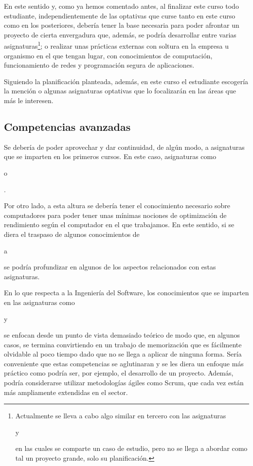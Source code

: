 En este sentido y, como ya hemos comentado antes,
al finalizar este curso todo estudiante,
independientemente de las optativas que curse
tanto en este curso como en los posteriores,
debería tener la base necesaria para
poder afrontar un proyecto de cierta envergadura que, además,
se podría desarrollar entre varias asignaturas\footnote{
    Actualmente se lleva a cabo algo similar en tercero con las asignaturas
    \subject{Procesos de Desarrollo Software} y
    \subject{Gestión de Procesos de Desarrollo Software}
    en las cuales se comparte un caso de estudio,
    pero no se llega a abordar como tal un proyecto grande,
    solo su planificación.
}; o realizar unas prácticas externas con soltura en la empresa u organismo
en el que tengan lugar,
con conocimientos de computación,
funcionamiento de redes y
programación segura de aplicaciones.

Siguiendo la planificación planteada, además,
en este curso el estudiante escogería la mención o
algunas asignaturas optativas
que lo focalizarán en las áreas que más le interesen.

\subsection{Competencias avanzadas}

Se debería de poder aprovechar y dar continuidad, de algún modo,
a asignaturas que se imparten en los primeros cursos.
En este caso, asignaturas como
\subject{Programación Concurrente y Distribuida} o \subject{Bases de Datos}.

Por otro lado, a esta altura se debería tener
el conocimiento necesario sobre computadores para
poder tener unas mínimas nociones de optimización de rendimiento
según el computador en el que trabajamos.
En este sentido, si se diera el traspaso de algunos conocimientos de
\subject{Arquitectura y Organización de Computadores} a
\subject{Ampliación de Estructura de Computadores}
se podría profundizar en algunos de los aspectos
relacionados con estas asignaturas.

En lo que respecta a la Ingeniería del Software,
los conocimientos que se imparten en las asignaturas como
\subject{Procesos de Desarrollo Software} y
\subject{Gestión de Proyectos de Desarrollo de Software}
se enfocan desde un punto de vista demasiado teórico de modo que,
en algunos casos,
se termina convirtiendo en un trabajo de memorización que
es fácilmente olvidable al poco tiempo
dado que no se llega a aplicar de ninguna forma.
Sería conveniente que estas competencias se aglutinaran y
se les diera un enfoque más práctico como podría ser, por ejemplo,
el desarrollo de un proyecto.
Además, podría considerarse utilizar metodologías ágiles como Scrum,
que cada vez están más ampliamente extendidas en el sector.

